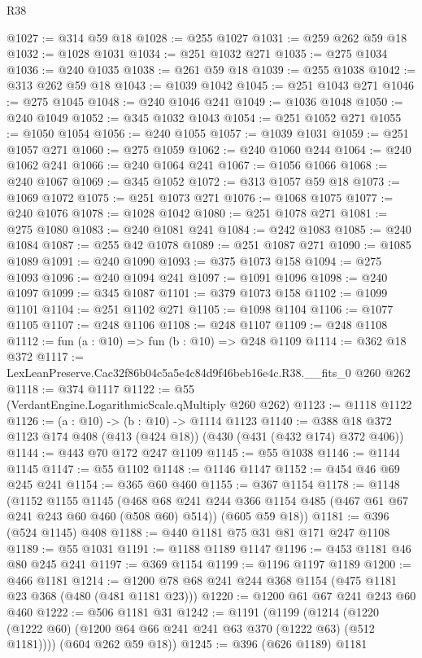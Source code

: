 \begin{lexlean}{R38}
\begin{coremodule}
@1027 := @314 @59 @18
@1028 := @255 @1027
@1031 := @259 @262 @59 @18
@1032 := @1028 @1031
@1034 := @251 @1032 @271
@1035 := @275 @1034
@1036 := @240 @1035
@1038 := @261 @59 @18
@1039 := @255 @1038
@1042 := @313 @262 @59 @18
@1043 := @1039 @1042
@1045 := @251 @1043 @271
@1046 := @275 @1045
@1048 := @240 @1046 @241
@1049 := @1036 @1048
@1050 := @240 @1049
@1052 := @345 @1032 @1043
@1054 := @251 @1052 @271
@1055 := @1050 @1054
@1056 := @240 @1055
@1057 := @1039 @1031
@1059 := @251 @1057 @271
@1060 := @275 @1059
@1062 := @240 @1060 @244
@1064 := @240 @1062 @241
@1066 := @240 @1064 @241
@1067 := @1056 @1066
@1068 := @240 @1067
@1069 := @345 @1052
@1072 := @313 @1057 @59 @18
@1073 := @1069 @1072
@1075 := @251 @1073 @271
@1076 := @1068 @1075
@1077 := @240 @1076
@1078 := @1028 @1042
@1080 := @251 @1078 @271
@1081 := @275 @1080
@1083 := @240 @1081 @241
@1084 := @242 @1083
@1085 := @240 @1084
@1087 := @255 @42 @1078
@1089 := @251 @1087 @271
@1090 := @1085 @1089
@1091 := @240 @1090
@1093 := @375 @1073 @158
@1094 := @275 @1093
@1096 := @240 @1094 @241
@1097 := @1091 @1096
@1098 := @240 @1097
@1099 := @345 @1087
@1101 := @379 @1073 @158
@1102 := @1099 @1101
@1104 := @251 @1102 @271
@1105 := @1098 @1104
@1106 := @1077 @1105
@1107 := @248 @1106
@1108 := @248 @1107
@1109 := @248 @1108
@1112 := fun (a : @10) => fun (b : @10) => @248 @1109
@1114 := @362 @18 @372
@1117 := LexLeanPreserve.Cac32f86b04c5a5e4c84d9f46beb16e4c.R38.__fits_0 @260 @262
@1118 := @374 @1117
@1122 := @55 (VerdantEngine.LogarithmicScale.qMultiply @260 @262)
@1123 := @1118 @1122
@1126 := (a : @10) -> (b : @10) -> @1114 @1123
@1140 := @388 @18 @372 @1123 @174 @408 (@413 (@424 @18)) (@430 (@431 (@432 @174) @372 @406))
@1144 := @443 @70 @172 @247 @1109
@1145 := @55 @1038
@1146 := @1144 @1145
@1147 := @55 @1102
@1148 := @1146 @1147
@1152 := @454 @46 @69 @245 @241
@1154 := @365 @60 @460
@1155 := @367 @1154
@1178 := @1148
    (@1152
      @1155
      @1145
      (@468 @68 @241 @244 @366 @1154 @485 (@467 @61 @67 @241 @243 @60 @460 (@508 @60) @514))
      (@605 @59 @18))
@1181 := @396 (@524 @1145) @408
@1188 := @440 @1181 @75 @31 @81 @171 @247 @1108
@1189 := @55 @1031
@1191 := @1188 @1189 @1147
@1196 := @453 @1181 @46 @80 @245 @241
@1197 := @369 @1154
@1199 := @1196 @1197 @1189
@1200 := @466 @1181
@1214 := @1200 @78 @68 @241 @244 @368 @1154 (@475 @1181 @23 @368 (@480 (@481 @1181 @23)))
@1220 := @1200 @61 @67 @241 @243 @60 @460
@1222 := @506 @1181 @31
@1242 := @1191
    (@1199
      (@1214 (@1220 (@1222 @60) (@1200 @64 @66 @241 @241 @63 @370 (@1222 @63) (@512 @1181))))
      (@604 @262 @59 @18))
@1245 := @396 (@626 @1189) @1181

\end{coremodule}
\end{lexlean}
